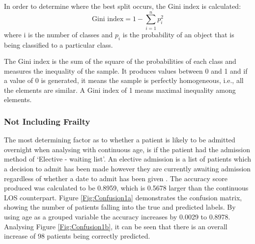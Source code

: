\documentclass[../thesis.tex]{subfiles}
\begin{document}
In order to determine where the best split occurs, the Gini index is calculated:
\begin{equation}
    \textrm{Gini index} = 1 - \sum^{n}_{i=1}p^{2}_{i}
\end{equation}
where i is the number of classes and $p_{i}$ is the probability of an object that is being classified to a particular class.

The Gini index is the sum of the square of the probabilities of each class and measures the inequality of the sample. It produces values between 0 and 1 and if a value of 0 is generated, it means the sample is perfectly homogeneous, i.e., all the elements are similar. A Gini index of 1 means maximal inequality among elements.

\subsubsection{Not Including Frailty}
The most determining factor as to whether a patient is likely to be admitted overnight when analysing with continuous age, is if the patient had the admission method of `Elective - waiting list'. An elective admission is a list of patients which a decision to admit has been made however  they are currently awaiting admission regardless of whether a date to admit has been given \cite{NHSDigital2021}. The accuracy score produced was calculated to be 0.8959, which is 0.5678 larger than the continuous LOS counterpart. Figure \ref{Fig:Confusion1a} demonstrates the confusion matrix, showing the number of patients falling into the true and predicted labels. By using age as a grouped variable the accuracy increases by 0.0029 to 0.8978. Analysing Figure \ref{Fig:Confusion1b}, it can be seen that there is an overall increase of 98 patients being correctly predicted. %
\end{document}
